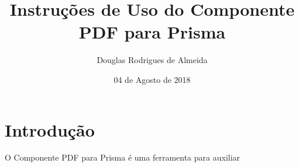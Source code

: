 \documentclass[12pt,a4paper]{article}
\title{Instruções de Uso do Componente PDF para Prisma}
\author{Douglas Rodrigues de Almeida}
\date{04 de Agosto de 2018}
\begin{document}
\maketitle

\section{Introdução}
O Componente PDF para Prisma é uma ferramenta para auxiliar 
\end{document}
